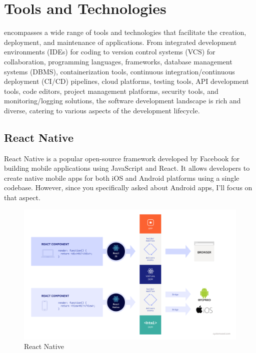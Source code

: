 \chapter{Tools and Technologies}

\justify
{\myprojectname} encompasses a wide range of tools and technologies that facilitate the creation, deployment, and maintenance of applications. From integrated development environments (IDEs) for coding to version control systems (VCS) for collaboration, programming languages, frameworks, database management systems (DBMS), containerization tools, continuous integration/continuous deployment (CI/CD) pipelines, cloud platforms, testing tools, API development tools, code editors, project management platforms, security tools, and monitoring/logging solutions, the software development landscape is rich and diverse, catering to various aspects of the development lifecycle.
\section{React Native}
\justify

React Native is a popular open-source framework developed by Facebook for building mobile applications using JavaScript and React. It allows developers to create native mobile apps for both iOS and Android platforms using a single codebase. However, since you specifically asked about Android apps, I'll focus on that aspect.

\begin{figure}
  \centering
  \includegraphics[width=0.90\linewidth]{Media/react-diagram_3.png}
  \caption{React Native}
  \label{fig:React Native}
\end{figure}

